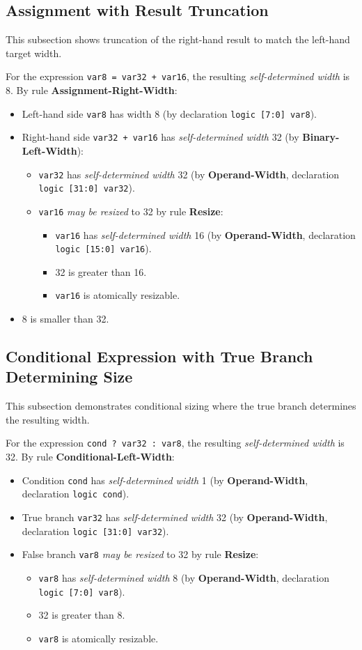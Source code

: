\documentclass{article}
\newcommand{\sv}[1]{{\color{black}\texttt{#1}}}
\newcommand{\sds}{\emph{self-determined width}}
\newcommand{\mbr}{\emph{may be resized}}
\begin{document}
{\subsection{Assignment with Result Truncation}

This subsection shows truncation of the right-hand result to match
the left-hand target width.

For the expression \sv{var8 = var32 + var16}, the resulting
\sds{} is 8. By rule \textbf{Assignment-Right-Width}:
\begin{itemize}
  \item Left-hand side \sv{var8} has width 8 (by
    declaration \sv{logic [7:0] var8}).
  \item Right-hand side \sv{var32 + var16} has \sds{} 32
    (by \textbf{Binary-Left-Width}):
    \begin{itemize}
      \item \sv{var32} has \sds{} 32 (by
        \textbf{Operand-Width}, declaration
        \sv{logic [31:0] var32}).
      \item \sv{var16} \mbr{} to 32 by rule \textbf{Resize}:
        \begin{itemize}
          \item \sv{var16} has \sds{} 16 (by
            \textbf{Operand-Width}, declaration
            \sv{logic [15:0] var16}).
          \item 32 is greater than 16.
          \item \sv{var16} is atomically resizable.
        \end{itemize}
    \end{itemize}
  \item 8 is smaller than 32.
\end{itemize}

\subsection{Conditional Expression with True Branch Determining Size}

This subsection demonstrates conditional sizing where the true
branch determines the resulting width.

For the expression \sv{cond ? var32 : var8}, the resulting \sds{} is
32. By rule \textbf{Conditional-Left-Width}:
\begin{itemize}
  \item Condition \sv{cond} has \sds{} 1 (by
    \textbf{Operand-Width}, declaration \sv{logic cond}).
  \item True branch \sv{var32} has \sds{} 32 (by
    \textbf{Operand-Width}, declaration \sv{logic [31:0] var32}).
  \item False branch \sv{var8} \mbr{} to 32 by rule \textbf{Resize}:
    \begin{itemize}
      \item \sv{var8} has \sds{} 8 (by
        \textbf{Operand-Width}, declaration \sv{logic [7:0] var8}).
      \item 32 is greater than 8.
      \item \sv{var8} is atomically resizable.
    \end{itemize}
\end{itemize}

}
\end{document}
